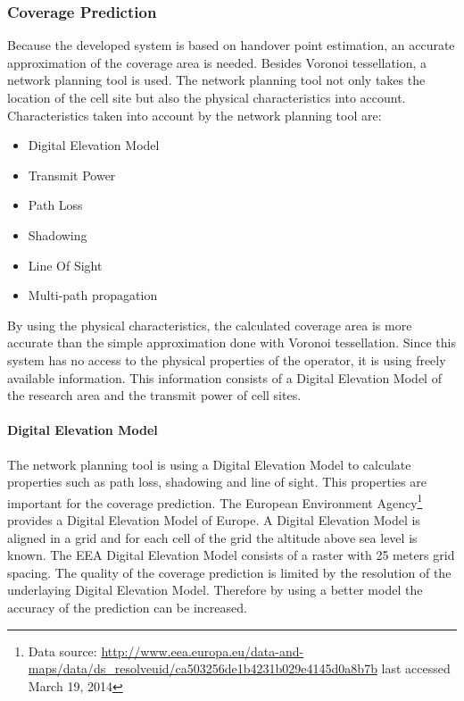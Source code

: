 \documentclass[master,english]{hgbthesis}
\begin{document}
\subsubsection{Coverage Prediction}
Because the developed system is based on handover point estimation, an accurate approximation of the coverage area is needed. Besides Voronoi tessellation, a network planning tool is used. The network planning tool not only takes the location of the cell site but also the physical characteristics into account. Characteristics taken into account by the network planning tool are:
\begin{itemize}
	\item Digital Elevation Model
	\item Transmit Power
	\item Path Loss
	\item Shadowing
	\item Line Of Sight
	\item Multi-path propagation
\end{itemize}
By using the physical characteristics, the calculated coverage area is more accurate than the simple approximation done with Voronoi tessellation. Since this system has no access to the physical properties of the operator, it is using freely available information. This information consists of a Digital Elevation Model of the research area and the transmit power of cell sites.
\paragraph{Digital Elevation Model}
The network planning tool is using a Digital Elevation Model to calculate properties such as path loss, shadowing and line of sight. This properties are important for the coverage prediction. The European Environment Agency\footnote{Data source: \url{http://www.eea.europa.eu/data-and-maps/data/ds_resolveuid/ca503256de1b4231b029e4145d0a8b7b} last accessed March 19, 2014} provides a Digital Elevation Model of Europe. A Digital Elevation Model is aligned in a grid and for each cell of the grid the altitude above sea level is known. The EEA Digital Elevation Model consists of a raster with 25 meters grid spacing. The quality of the coverage prediction is limited by the resolution of the underlaying Digital Elevation Model. Therefore by using a better model the accuracy of the prediction can be increased.
\end{document}
